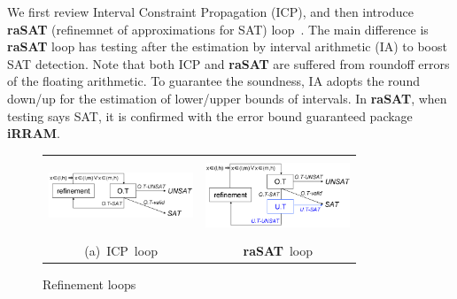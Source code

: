 \documentclass[runningheads,a4paper,oribibl]{llncs}
\begin{document}
We first review Interval Constraint Propagation (ICP), and then introduce
\textbf{raSAT} (refinemnet of approximations for SAT) loop~\cite{VanKhanh201227}.
The main difference is {\bf raSAT} loop has testing after the estimation
by interval arithmetic (IA) to boost SAT detection.
Note that both ICP and {\bf raSAT} are suffered from roundoff errors of
the floating arithmetic. To guarantee the soundness, IA adopts
the round down/up for the estimation of lower/upper bounds of intervals.
In {\bf raSAT}, when testing says SAT, it is confirmed with
the error bound guaranteed package {\bf iRRAM}. 
\begin{figure}[ht]
\begin{minipage}[b]{1.0\linewidth}
\centering
\begin{tabular}{c@{\qquad}c}
\includegraphics[height=0.6in,width=1.7in]{OTloop.png} & 
\includegraphics[height=0.9in,width=1.7in]{rasatloop.png} \\   
\mbox{(a) ICP loop} & \mbox{{\bf raSAT} loop} \\
\end{tabular}
\end{minipage} 
\caption{Refinement loops} 
\label{fig:OTrefine} 
\end{figure}
\end{document}
